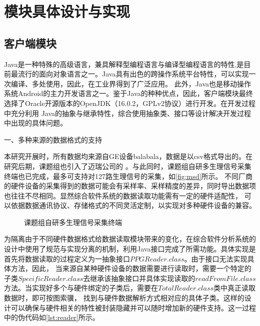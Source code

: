 \section{模块具体设计与实现}
\subsection{客户端模块}
Java是一种特殊的高级语言，兼具解释型编程语言与编译型编程语言的特性,是目前最流行的面向对象语言之一\cite{Li2015}。Java具有出色的跨操作系统平台特性，可以实现一次编译、多处使用，因此，在工业界得到了广泛应用。
此外，Java也是移动操作系统Android的主力开发语言之一\cite{android}。鉴于Java的种种优点，因此，客户端模块最终选择了Oracle开源版本的OpenJDK（16.0.2，GPLv2协议）\cite{openjdk}进行开发。在开发过程中充分利用
Java的抽象与继承特性，综合使用抽象类、接口等设计解决开发过程中出现的具体问题。

一、多种来源的数据格式的支持

本研究开展时，所有数据均来源自GE设备balabala，数据是以csv格式导出的。在研究后期，课题组也引入了迈瑞公司的 。与此同时，课题组自研多生理信号采集终端也已完成，最多可支持对127路生理信号的采集，如\autoref{fig:msd}所示。
不同厂商的硬件设备的采集得到的数据可能会有采样率、采样精度的差异，同时导出数据项也往往不尽相同。显然综合软件系统的数据读取功能需有一定的硬件适配性，
可以依据数据通讯协议、存储格式的不同灵活定制，以实现对多种硬件设备的兼容。
\begin{figure}[htbp]
    \centering
    \quad
    \caption{\label{fig:msd}课题组自研多生理信号采集终端}
\end{figure}

为隔离由于不同硬件数据格式给数据读取模块带来的变化，在综合软件分析系统的设计中使用了规范与实现分离的机制，利用Java接口完成了所需功能。具体实现是首先将数据读取的过程定义为一抽象接口$PPGReader.class$。由于接口无法实现具体方法，因此，
当来源自某种硬件设备的数据需要进行读取时，需要一个特定的子类$SpecificReader.class$去继承该抽象接口并具体实现读取的$readFromFile.class$方法。当实现好多个与硬件绑定的子类后，需要在$TotalReader.class$类中真正读取数据时，即可按图索骥，
找到与硬件数据解析方式相对应的具体子类。这样的设计可以确保与硬件相关的特性被封装隐藏并可以随时增加新的硬件支持。这一过程中的伪代码如\autoref{lst:reader}所示。



